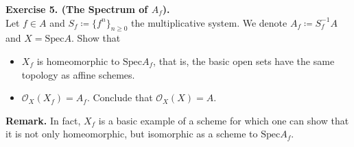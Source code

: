 \documentclass[12pt,a4paper,footinclude=true,headinclude=true]{scrbook} %
\newenvironment{exe}[2][Exercise]
    { \begin{mdframed}[backgroundcolor=gray!20] \textbf{#1 #2.}\\ }
    {  \end{mdframed}}
\begin{document}
\begin{exe}{5. (The Spectrum of $A_f$)}
    Let $f\in A$ and $S_f\coloneqq\{f^n\}_{n\geq0}$ the multiplicative system. We denote $A_f\coloneqq S_f^{-1}A$ and $X=\mathrm{Spec}A$. Show that 
    \begin{itemize}
        \item[(a)] $X_f$ is homeomorphic to $\mathrm{Spec}A_f$, that is, the basic open sets have the same topology as affine schemes.
        \item[(b)] $\mathcal{O}_X(X_f)=A_f$. Conclude that $\mathcal{O}_X(X)=A$.
    \end{itemize}
    \textbf{Remark.} In fact, $X_f$ is a basic example of a scheme for which one can show that it is not only homeomorphic, but isomorphic as a scheme to $\mathrm{Spec}A_f$.
\end{exe}
\end{document}
